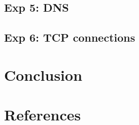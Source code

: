 \documentclass[compilation.tex]{subfiles}
\begin{document}
\subsection{Exp 5: DNS}
\label{exp:5}


\subsection{Exp 6: TCP connections}
\label{exp:6}

\section{Conclusion}
\label{sec:conclusion}

\section{References}
\label{sec:references}
\end{document}
